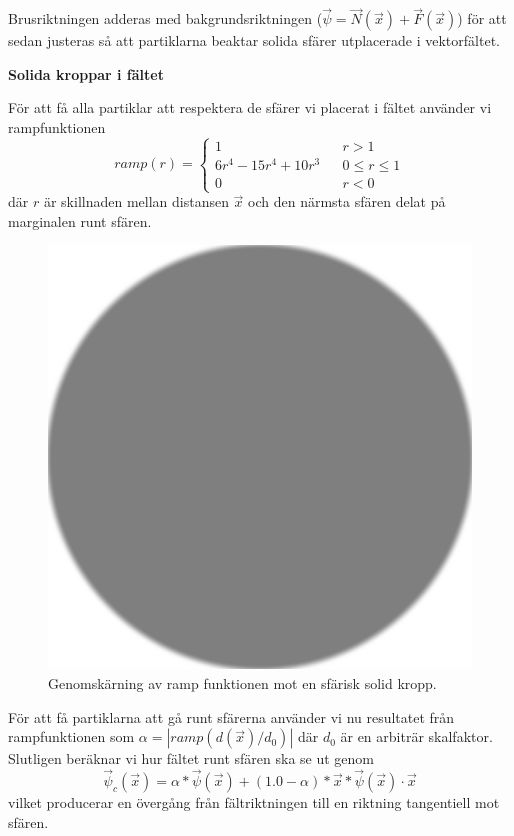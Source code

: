 \documentclass[a4paper]{article}
\begin{document}
\begin{multicols}{2}
Brusriktningen adderas med bakgrundsriktningen ($\vec{\psi} = \vec{N}(\vec{x}) + \vec{F}(\vec{x})$) för att sedan justeras så att partiklarna beaktar solida sfärer utplacerade i vektorfältet. 

\textbf{Solida kroppar i fältet}

För att få alla partiklar att respektera de sfärer vi placerat i fältet använder vi rampfunktionen
\begin{equation}
ramp(r) = \left\{\begin{matrix}
1  && r > 1
\\
6r^4 - 15r^4 + 10r^3 && 0 \le r \le 1
\\ 
0  && r < 0
\end{matrix}\right.
\end{equation}
där $r$ är skillnaden mellan distansen $\vec{x}$ och den närmsta sfären delat på marginalen runt sfären. 
\begin{figure}[H]
\center
\begin{minipage}[]{0.3\textwidth}
\includegraphics[width=\textwidth]{share/Alpha_downscale.png}
\caption{Genomskärning av ramp funktionen mot en sfärisk solid kropp.}
\end{minipage}
\end{figure}

För att få partiklarna att gå runt sfärerna använder vi nu resultatet från rampfunktionen som $\alpha = | ramp(d(\vec{x})/d_0) |$ där $d_0$  är en arbiträr skalfaktor. Slutligen beräknar vi hur fältet runt sfären ska se ut genom 
\begin{equation}
\vec{\psi}_c(\vec{x}) = \alpha * \vec{\psi}(\vec{x}) + (1.0 - \alpha) * \vec{x} * \vec{\psi}(\vec{x}) \cdot \vec{x}
\end{equation}
vilket producerar en övergång från fältriktningen till en riktning tangentiell mot sfären.


\end{multicols}
\end{document}
